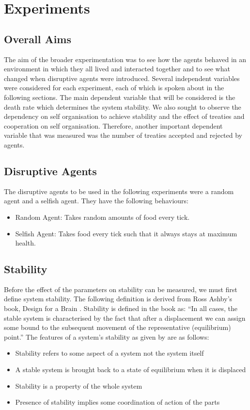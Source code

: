 \chapter{Experiments}\label{experiments}

\section{Overall Aims}
\label{sec: Overall Aims}
The aim of the broader experimentation was to see how the agents behaved in an environment in which they all lived and interacted together and to see what changed when disruptive agents were introduced.
Several independent variables were considered for each experiment, each of which is spoken about in the following sections.
The main dependent variable that will be considered is the death rate which determines the system stability. We also sought to observe the dependency on self organisation to achieve stability and the effect of treaties and cooperation on self organisation. Therefore, another important dependent variable that was measured was the number of treaties accepted and rejected by agents.

\section{Disruptive Agents}
\label{sec: Disruptive Agents}
The disruptive agents to be used in the following experiments were a random agent and a selfish agent. They have the following behaviours:
\begin{itemize}
    \item Random Agent: Takes random amounts of food every tick.
    \item Selfish Agent: Takes food every tick such that it always stays at maximum health.
\end{itemize}

\section{Stability}
\label{sec: Stability}
Before the effect of the parameters on stability can be measured, we must first define system stability. The following definition is derived from Ross Ashby’s book, Design for a Brain \cite{Ashby1960}.
Stability is defined in the book as:  “In all cases, the stable system is characterised by the fact that after a displacement we can assign some bound to the subsequent movement of the representative (equilibrium) point.”
The features of a system's stability as given by \cite{Ashby1960} are as follows:
\begin{itemize}
    \item Stability refers to some aspect of a system not the system itself
    \item A stable system is brought back to a state of equilibrium when it is displaced
    \item Stability is a property of the whole system
    \item Presence of stability implies some coordination of action of the parts
\end{itemize}
 
